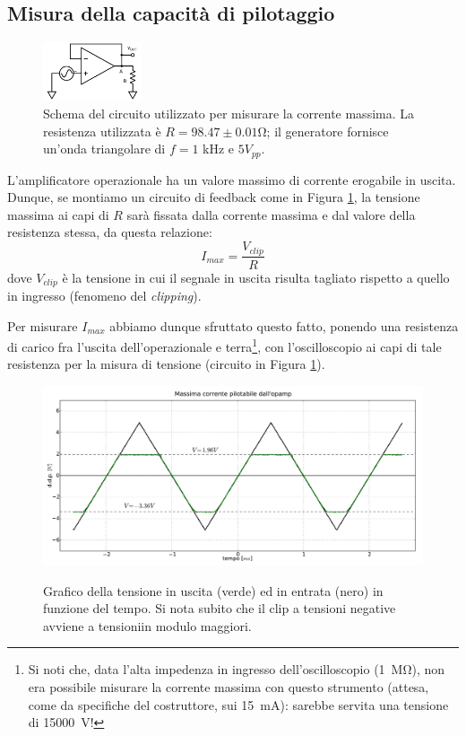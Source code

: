 \subsection{Misura della capacità di pilotaggio}

\begin{figure}
  \begin{center}
    \includegraphics[width=0.26\textwidth]{../E03/latex/max_current.pdf}
  \end{center}
  \caption{Schema del circuito utilizzato per misurare la corrente massima. La resistenza utilizzata è $R=98.47\pm0.01$\si{\ohm}; il generatore fornisce un'onda triangolare di $f=1$ \si{\kilo\hertz} e $5 V_{pp}$.}
  \label{cir3:max_current}
\end{figure}

L'amplificatore operazionale ha un valore massimo di corrente erogabile in uscita. Dunque, se montiamo un circuito di feedback come in Figura \ref{cir3:max_current}, la tensione massima ai capi di $R$ sarà fissata dalla corrente massima e dal valore della resistenza stessa, da questa relazione:
\begin{equation*}
	I_{max} = \frac{V_{clip}}{R}
\end{equation*}
dove $V_{clip}$ è la tensione in cui il segnale in uscita risulta tagliato rispetto a quello in ingresso (fenomeno del \textit{clipping}).

Per misurare $I_{max}$ abbiamo dunque sfruttato questo fatto, ponendo una resistenza di carico fra l'uscita dell'operazionale e terra\footnote{Si noti che, data l'alta impedenza in ingresso dell'oscilloscopio (\SI{1}{\mega\ohm}), non era possibile misurare la corrente massima con questo strumento (attesa, come da specifiche del costruttore, sui \SI{15}{\milli\ampere}): sarebbe servita una tensione di \SI{15000}{\volt}!}, con l'oscilloscopio ai capi di tale resistenza per la misura di tensione (circuito in Figura \ref{cir3:max_current}).

\begin{figure}[ht]
 \centering
   {\includegraphics[width=\textwidth]{../E03/latex/clip.pdf}}
 \caption{Grafico della tensione in uscita (verde) ed in entrata (nero) in funzione del tempo. Si nota subito che il clip a tensioni negative avviene a tensioniin modulo maggiori.}
 \label{gr3:clip}
\end{figure}

